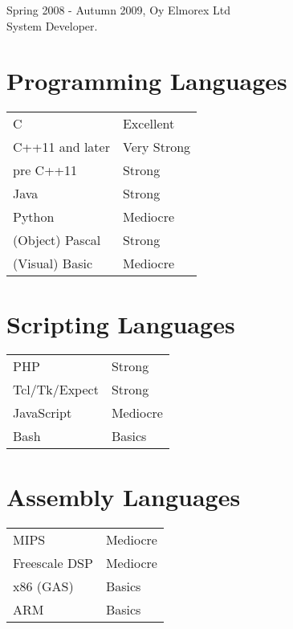\documentclass[12pt]{article}
\begin{document}
\large{Spring 2008 - Autumn 2009, Oy Elmorex Ltd}\\
\normalsize{System Developer.}\\


\section*{Programming Languages}

\begin{tabular}{ll}
C & Excellent\\
C++11 and later & Very Strong\\
pre C++11 & Strong\\
Java & Strong\\
Python & Mediocre\\
(Object) Pascal & Strong\\
(Visual) Basic & Mediocre
\end{tabular}


\section*{Scripting Languages}

\begin{tabular}{ll}
PHP & Strong\\
Tcl/Tk/Expect & Strong\\
JavaScript & Mediocre\\
Bash & Basics\\
\end{tabular}


\section*{Assembly Languages}

\begin{tabular}{ll}
MIPS & Mediocre\\
Freescale DSP & Mediocre\\
x86 (GAS) & Basics\\
ARM & Basics\\
\end{tabular}
\end{document}
